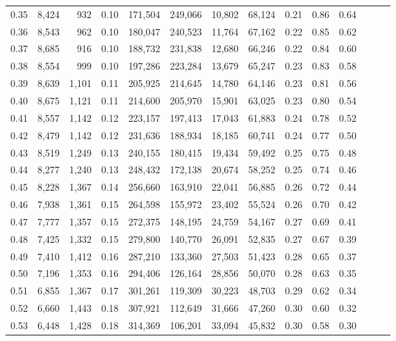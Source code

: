 \begin{tabular}{rrrrrrrrrrrrrr}
0.35 &  8,424 &    932 &  0.10 &  171,504 &  249,066 &  10,802 &  68,124 &  0.21 &  0.86 &      0.64 \\
0.36 &  8,543 &    962 &  0.10 &  180,047 &  240,523 &  11,764 &  67,162 &  0.22 &  0.85 &      0.62 \\
0.37 &  8,685 &    916 &  0.10 &  188,732 &  231,838 &  12,680 &  66,246 &  0.22 &  0.84 &      0.60 \\
0.38 &  8,554 &    999 &  0.10 &  197,286 &  223,284 &  13,679 &  65,247 &  0.23 &  0.83 &      0.58 \\
0.39 &  8,639 &  1,101 &  0.11 &  205,925 &  214,645 &  14,780 &  64,146 &  0.23 &  0.81 &      0.56 \\
0.40 &  8,675 &  1,121 &  0.11 &  214,600 &  205,970 &  15,901 &  63,025 &  0.23 &  0.80 &      0.54 \\
0.41 &  8,557 &  1,142 &  0.12 &  223,157 &  197,413 &  17,043 &  61,883 &  0.24 &  0.78 &      0.52 \\
0.42 &  8,479 &  1,142 &  0.12 &  231,636 &  188,934 &  18,185 &  60,741 &  0.24 &  0.77 &      0.50 \\
0.43 &  8,519 &  1,249 &  0.13 &  240,155 &  180,415 &  19,434 &  59,492 &  0.25 &  0.75 &      0.48 \\
0.44 &  8,277 &  1,240 &  0.13 &  248,432 &  172,138 &  20,674 &  58,252 &  0.25 &  0.74 &      0.46 \\
0.45 &  8,228 &  1,367 &  0.14 &  256,660 &  163,910 &  22,041 &  56,885 &  0.26 &  0.72 &      0.44 \\
0.46 &  7,938 &  1,361 &  0.15 &  264,598 &  155,972 &  23,402 &  55,524 &  0.26 &  0.70 &      0.42 \\
0.47 &  7,777 &  1,357 &  0.15 &  272,375 &  148,195 &  24,759 &  54,167 &  0.27 &  0.69 &      0.41 \\
0.48 &  7,425 &  1,332 &  0.15 &  279,800 &  140,770 &  26,091 &  52,835 &  0.27 &  0.67 &      0.39 \\
0.49 &  7,410 &  1,412 &  0.16 &  287,210 &  133,360 &  27,503 &  51,423 &  0.28 &  0.65 &      0.37 \\
0.50 &  7,196 &  1,353 &  0.16 &  294,406 &  126,164 &  28,856 &  50,070 &  0.28 &  0.63 &      0.35 \\
0.51 &  6,855 &  1,367 &  0.17 &  301,261 &  119,309 &  30,223 &  48,703 &  0.29 &  0.62 &      0.34 \\
0.52 &  6,660 &  1,443 &  0.18 &  307,921 &  112,649 &  31,666 &  47,260 &  0.30 &  0.60 &      0.32 \\
0.53 &  6,448 &  1,428 &  0.18 &  314,369 &  106,201 &  33,094 &  45,832 &  0.30 &  0.58 &      0.30 \\

\end{tabular}
